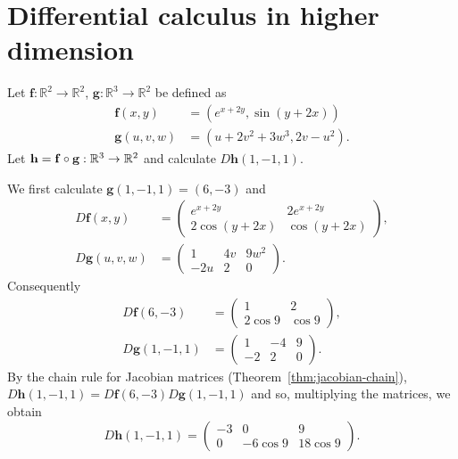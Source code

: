 \section{Differential calculus in higher dimension}

\begin{task}
    Let \(\mathbf{f}:\mathbb{R}^2\to\mathbb{R}^2\), \(\mathbf{g}:\mathbb{R}^3\to\mathbb{R}^2\) be defined as
    \[
        \begin{aligned}
            \mathbf{f}(x,y)   & = (e^{x+2y}, \sin(y+2x)) \\
            \mathbf{g}(u,v,w) & = (u+2v^2+3w^3,2v-u^2).
        \end{aligned}
    \]
    Let \(\mathbf{h} =\mathbf{f} \circ \mathbf{g} : \mathbb{R}^3 \to \mathbb{R}^2\) and calculate \(D\mathbf{h}(1,-1,1)\).
\end{task}

\begin{solution}
    We first calculate \(\mathbf{g}(1,-1,1) = (6,-3)\) and
    \[
        \begin{aligned}
            D\mathbf{f}(x,y)   & =
            \begin{pmatrix}
                e^{x+2y}     & 2 e^{x+2y} \\
                2 \cos(y+2x) & \cos(y+2x)
            \end{pmatrix}, \\
            D\mathbf{g}(u,v,w) & =
            \begin{pmatrix}
                1   & 4v & 9w^2 \\
                -2u & 2  & 0
            \end{pmatrix}.
        \end{aligned}
    \]
    Consequently
    \[
        \begin{aligned}
            D\mathbf{f}(6,-3)   & =
            \begin{pmatrix}
                1        & 2      \\
                2 \cos 9 & \cos 9
            \end{pmatrix}, \\
            D\mathbf{g}(1,-1,1) & =
            \begin{pmatrix}
                1  & -4 & 9 \\
                -2 & 2  & 0
            \end{pmatrix}.
        \end{aligned}
    \]
    By the chain rule for Jacobian matrices (Theorem~\ref{thm:jacobian-chain}),
    \( D\mathbf{h}(1,-1,1) = D\mathbf{f}(6,-3)  D\mathbf{g}(1,-1,1) \)
    and so, multiplying the matrices, we obtain
    \[
        D\mathbf{h}(1,-1,1) =
        \begin{pmatrix}
            -3 & 0        & 9        \\
            0  & -6\cos 9 & 18\cos 9
        \end{pmatrix}.
    \]
\end{solution}



